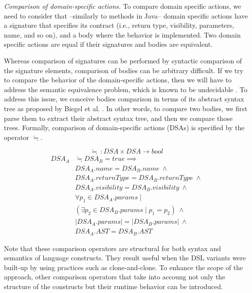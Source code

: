 \emph{Comparison of domain-specific actions.} To compare domain specific actions, we need to consider that --similarly to methods in Java-- domain specific actions have a signature that specifies its contract (i.e., return type, visibility, parameters, name, and so on), and a body where the behavior is implemented. Two domain specific actions are equal if their signatures and bodies are equivalent.

Whereas comparison of signatures can be performed by syntactic comparison of the signature elements, comparison of bodies can be arbitrary difficult. If we try to compare the behavior of the domain-specific actions, then we will have to address the semantic equivalence problem, which is known to be undecidable \cite{Lucanu:2013}. To address this issue, we conceive bodies comparison in terms of its abstract syntax tree as proposed by Biegel et al. \cite{Biegel:2010}. In other words, to compare two bodies, we first parse them to extract their abstract syntax tree, and then we compare those trees. Formally, comparison of domain-specific actions (DSAs) is specified by the operator $\fallingdotseq$.  

\begin{equation}
  \fallingdotseq~: DSA \times DSA \rightarrow bool
\end{equation}
\begin{equation}
\begin{split}
  DSA_{A} & \fallingdotseq DSA_{B} = true \implies \\
   & DSA_{A}.name = DSA_{B}.name ~ \wedge \\
   & DSA_{A}.returnType = DSA_{B}.returnType ~ \wedge \\
   & DSA_{A}.visibility = DSA_{B}.visibility ~ \wedge \\
   & \forall p_1 \in DSA_{A}.params \mid \\
   & (\exists p_2 \in DSA_{B}.params \mid p_1 = p_2)  ~ \wedge \\
   & |DSA_{A}.params| = |DSA_{B}.params|  ~ \wedge \\
   & DSA_{A}.AST = DSA_{B}.AST
 \end{split}
\end{equation}

Note that these comparison operators are structural for both syntax and semantics of language constructs. They result useful when the DSL variants were built-up by using practices such as clone-and-clone. To enhance the scope of the approach, other comparison operators that take into accoung not only the structure of the constructs but their runtime behavior can be introduced. 

